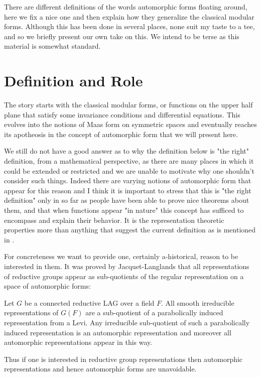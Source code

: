 There are different definitions of the words automorphic forms floating around, here we fix a nice one and then explain how they generalize the classical modular forms. Although this has been done in several places, none suit my taste to a tee, and so we briefly present our own take on this. We intend to be terse as this material is somewhat standard.

\section{Definition and Role}
The story starts with the classical modular forms, or functions on the upper half plane that satisfy some invariance conditions and differential equations. This evolves into the notions of Maas form on symmetric spaces and eventually reaches its apotheosis in the concept of automorphic form that we will present here. 

We still do not have a good answer as to why the definition below is "the right" definition, from a mathematical perspective, as there are many places in which it could be extended or restricted and we are unable to motivate why one shouldn't consider such things. Indeed there are varying notions of automorphic form that appear for this reason and I think it is important to stress that this is "the right definition" only in so far as people have been able to prove nice theorems about them, and that when functions appear "in nature" this concept has sufficed to encompass and explain their behavior. It is the representation theoretic properties more than anything that suggest the current definition as is mentioned in \cite[1.II.3]{borelAutomorphicFormsRepresentations1979}.

For concreteness we want to provide one, certainly a-historical, reason to be interested in them. It was proved by Jacquet-Langlands that all representations of reductive groups appear as sub-quotients of the regular representation on a space of automorphic forms:

\begin{Theorem}
    Let \(G\) be a connected reductive LAG over a field \(F\).
    All smooth irreducible representations of \(G(F)\) are a sub-quotient of a parabolically induced representation from a Levi. Any irreducible sub-quotient of such a parabolically induced representation is an automorphic representation and moreover all automorphic representations appear in this way. 
\end{Theorem}
Thus if one is interested in reductive group representations then automorphic representations and hence automorphic forms are unavoidable.

